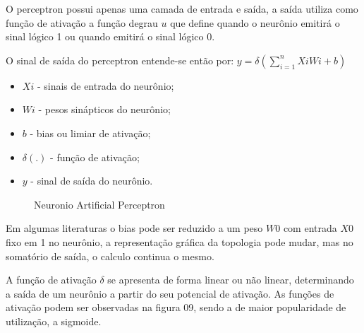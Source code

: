 \documentclass[	12pt, Times, openright, twoside, a4paper, english, brazil]{abntex2}
\begin{document}
            O perceptron \cite{Flavia2014} possui apenas uma camada de entrada e saída, a saída utiliza como função de ativação a função degrau $u$ que define quando o neurônio emitirá o sinal lógico 1 ou quando emitirá o sinal lógico 0.

            O sinal de saída do perceptron entende-se então por:
            $y= \delta(\sum_{i=1}^{n}XiWi+b)$
            \begin{itemize}
            	\item $ Xi $ - sinais de entrada do neurônio;
            	\item $ Wi $ - pesos sinápticos do neurônio;
            	\item $ b $ - bias ou limiar de ativação;
            	\item $ \delta(.) $ - função de ativação;
            	\item $ y $ - sinal de saída do neurônio.
            \end{itemize}
			
            \begin{figure}[!ht]
            \caption{Neuronio Artificial Perceptron\label{fig:perceptron}}
            \end{figure}
			
			     Em algumas literaturas o bias pode ser reduzido a um peso $W0$ com entrada $X0$ fixo em 1 no neurônio, a representação gráfica da topologia pode mudar, mas no somatório de saída, o calculo continua o mesmo.
			
			     A função de ativação $\delta$ se apresenta de forma linear ou não linear, determinando a saída de um neurônio a partir do seu potencial de ativação. 
			     As funções de ativação podem ser observadas na figura 09, sendo a de maior popularidade de utilização, a sigmoide.
			
\end{document}
